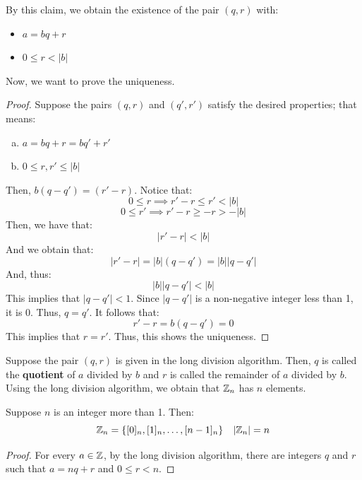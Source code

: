 \documentclass[letterpaper]{article}
\begin{document}
By this claim, we obtain the existence of the pair $(q, r)$ with:
\begin{itemize}
    \item $a = bq + r$
    \item $0 \leq r < |b|$
\end{itemize}
Now, we want to prove the uniqueness.
\begin{mdframed}
    \begin{proof}
        Suppose the pairs $(q, r)$ and $(q', r')$ satisfy the desired properties; that means:
        \begin{enumerate}[(a)]
            \item $a = bq + r = bq' + r'$
            \item $0 \leq r, r' \leq |b|$
        \end{enumerate}
        Then, $b(q - q') = (r' - r)$. Notice that:
        \[0 \leq r \implies r' - r \leq r' < |b|\]
        \[0 \leq r' \implies r' - r \geq -r > -|b|\]
        Then, we have that:
        \[|r' - r| < |b|\]
        And we obtain that:
        \[|r' - r| = |b|(q - q') = |b| |q - q'|\]
        And, thus:
        \[|b||q - q'| < |b|\]
        This implies that $|q - q'| < 1$. Since $|q - q'|$ is a non-negative integer less than 1, it is 0. Thus, $q = q'$. It follows that:
        \[r' - r = b(q - q') = 0\]
        This implies that $r = r'$. Thus, this shows the uniqueness. 
    \end{proof}
\end{mdframed}

Suppose the pair $(q, r)$ is given in the long division algorithm. Then, $q$ is called the \textbf{quotient} of $a$ divided by $b$ and $r$ is called the remainder of $a$ divided by $b$. Using the long division algorithm, we obtain that $\mathbb{Z}_n$ has $n$ elements. 

\begin{proposition}
    Suppose $n$ is an integer more than 1. Then:
    \[\mathbb{Z}_n = \{[0]_n, [1]_n, \dots, [n - 1]_n\} \quad |\mathbb{Z}_n| = n\]
\end{proposition}
\begin{mdframed}
    \begin{proof}
        For every $a \in \mathbb{Z}$, by the long division algorithm, there are integers $q$ and $r$ such that $a = nq + r$ and $0 \leq r < n$. 
    \end{proof}
\end{mdframed}


\end{document}

